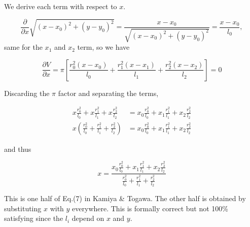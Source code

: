 \documentclass[a4paper, 11pt]{article} %
\newcommand{\sqlen}[1]{\ensuremath{(x - x_{#1})^2 + (y-y_{#1})^2}}
\newcommand{\rili}[1]{\ensuremath{\frac{r_{#1}^2}{l_{#1}}}}
\begin{document}
\begin{appendices}
We derive each term with respect to $x$.

\begin{equation*}
\frac{\partial}{\partial x} \sqrt{\sqlen{0}} = \frac{x-x_0}{\sqrt{\sqlen{0}}} = \frac{x-x_0}{l_0},
\end{equation*}
same for the $x_1$ and $x_2$ term, so we have

\begin{equation*}
\frac{\partial V}{\partial x} = \pi\left[ \frac{r_0^2(x-x_0)}{l_0} + \frac{r_1^2(x-x_1)}{l_1} + \frac{r_2^2(x-x_2)}{l_2}\right] = 0
\end{equation*}

Discarding the $\pi$ factor and separating the terms,

\begin{align*}
x\rili{0} + x\rili{1} + x\rili{2} &= x_0\rili{0} + x_1\rili{1} + x_2\rili{2} \\
x(\rili{0} + \rili{1} + \rili{2}) &= x_0\rili{0} + x_1\rili{1} + x_2\rili{2} 
\end{align*}

and thus

\begin{equation*}
x = \frac{x_0\rili{0} + x_1\rili{1} + x_2\rili{2}}{\rili{0} + \rili{1} + \rili{2}}
\end{equation*}

This is one half of Eq.(7) in Kamiya \& Togawa. The other half is obtained by substituting $x$ with $y$ everywhere. This is
formally correct but not 100\% satisfying since the $l_i$ depend on $x$ and $y$.

\end{appendices}






\end{document}
